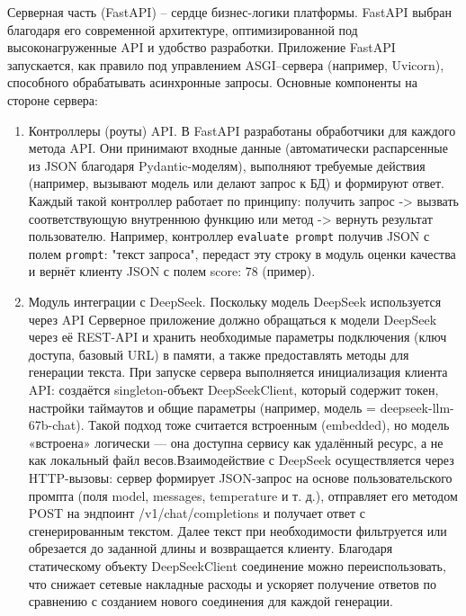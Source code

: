 Серверная часть (FastAPI) – сердце бизнес-логики платформы. FastAPI выбран благодаря его современной архитектуре, оптимизированной под высоконагруженные API и удобство разработки. Приложение FastAPI запускается, как правило под управлением ASGI--сервера (например, Uvicorn), способного обрабатывать асинхронные запросы. Основные компоненты на стороне сервера:
\begin{enumerate}[label=\arabic*]
    \item Контроллеры (роуты) API. В FastAPI разработаны обработчики для каждого метода API. Они принимают входные данные (автоматически распарсенные из JSON благодаря Pydantic-моделям), выполняют требуемые действия (например, вызывают модель или делают запрос к БД) и формируют ответ. Каждый такой контроллер работает по принципу: получить запрос -> вызвать соответствующую внутреннюю функцию или метод -> вернуть результат пользователю. Например, контроллер \verb|evaluate prompt| получив JSON с полем \verb|prompt|: "текст запроса", передаст эту строку в модуль оценки качества и вернёт клиенту JSON с полем score: 78 (пример).
    \item Модуль интеграции с DeepSeek. Поскольку модель DeepSeek используется через API Серверное приложение должно обращаться к модели DeepSeek через её REST-API и хранить необходимые параметры подключения (ключ доступа, базовый URL) в памяти, а также предоставлять методы для генерации текста. При запуске сервера выполняется инициализация клиента API: создаётся singleton-объект DeepSeekClient, который содержит токен, настройки таймаутов и общие параметры (например, модель = deepseek-llm-67b-chat). Такой подход тоже считается встроенным (embedded), но модель «встроена» логически — она доступна сервису как удалённый ресурс, а не как локальный файл весов\cite{deepseek:docs}.Взаимодействие с DeepSeek осуществляется через HTTP-вызовы: сервер формирует JSON-запрос на основе пользовательского промпта (поля model, messages, temperature и т. д.), отправляет его методом POST на эндпоинт /v1/chat/completions и получает ответ с сгенерированным текстом. Далее текст при необходимости фильтруется или обрезается до заданной длины и возвращается клиенту. Благодаря статическому объекту DeepSeekClient соединение можно переиспользовать, что снижает сетевые накладные расходы и ускоряет получение ответов по сравнению с созданием нового соединения для каждой генерации.

\end{enumerate}
